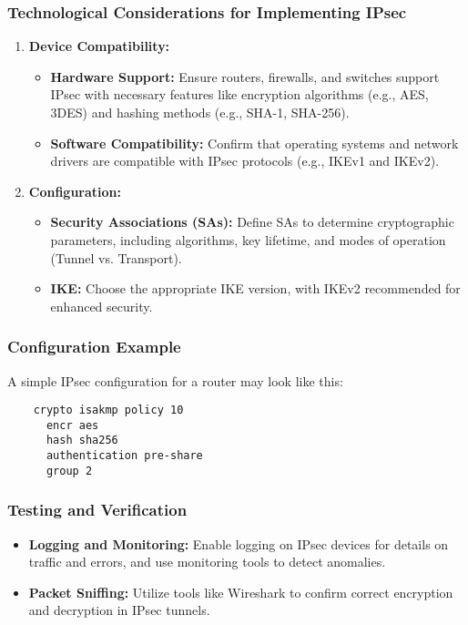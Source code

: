 \documentclass{beamer}
\begin{document}
\begin{frame}
    \frametitle{Technological Considerations for Implementing IPsec}
    \begin{enumerate}
        \item \textbf{Device Compatibility:}
            \begin{itemize}
                \item \textbf{Hardware Support:} Ensure routers, firewalls, and switches support IPsec with necessary features like encryption algorithms (e.g., AES, 3DES) and hashing methods (e.g., SHA-1, SHA-256).
                \item \textbf{Software Compatibility:} Confirm that operating systems and network drivers are compatible with IPsec protocols (e.g., IKEv1 and IKEv2).
            \end{itemize}
        \item \textbf{Configuration:}
            \begin{itemize}
                \item \textbf{Security Associations (SAs):} Define SAs to determine cryptographic parameters, including algorithms, key lifetime, and modes of operation (Tunnel vs. Transport).
                \item \textbf{IKE:} Choose the appropriate IKE version, with IKEv2 recommended for enhanced security.
            \end{itemize}
    \end{enumerate}
\end{frame}

\begin{frame}[fragile]
    \frametitle{Configuration Example}
    A simple IPsec configuration for a router may look like this:
    \begin{lstlisting}
    crypto isakmp policy 10
      encr aes
      hash sha256
      authentication pre-share
      group 2
    \end{lstlisting}
\end{frame}

\begin{frame}
    \frametitle{Testing and Verification}
    \begin{itemize}
        \item \textbf{Logging and Monitoring:} Enable logging on IPsec devices for details on traffic and errors, and use monitoring tools to detect anomalies.
        \item \textbf{Packet Sniffing:} Utilize tools like Wireshark to confirm correct encryption and decryption in IPsec tunnels.
    \end{itemize}
\end{frame}
\end{document}
